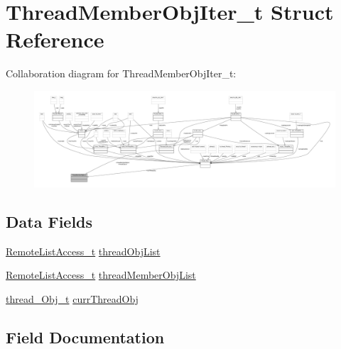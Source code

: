 \hypertarget{struct_thread_member_obj_iter__t}{}\section{Thread\+Member\+Obj\+Iter\+\_\+t Struct Reference}
\label{struct_thread_member_obj_iter__t}


Collaboration diagram for Thread\+Member\+Obj\+Iter\+\_\+t\+:
\nopagebreak
\begin{figure}[H]
\begin{center}
\leavevmode
\includegraphics[width=350pt]{struct_thread_member_obj_iter__t__coll__graph}
\end{center}
\end{figure}
\subsection*{Data Fields}
\begin{DoxyCompactItemize}
\item 
\hyperlink{struct_remote_list_access__t}{Remote\+List\+Access\+\_\+t} \hyperlink{struct_thread_member_obj_iter__t_a2057e6b20a4c0d6f737d351a76a33953}{thread\+Obj\+List}
\item 
\hyperlink{struct_remote_list_access__t}{Remote\+List\+Access\+\_\+t} \hyperlink{struct_thread_member_obj_iter__t_a9ec33dda4e021ea0a6bd56dfee4189ff}{thread\+Member\+Obj\+List}
\item 
\hyperlink{structthread___obj__t}{thread\+\_\+\+Obj\+\_\+t} \hyperlink{struct_thread_member_obj_iter__t_a966e49d77b883c05200a5d02c5869e7f}{curr\+Thread\+Obj}
\end{DoxyCompactItemize}


\subsection{Field Documentation}
